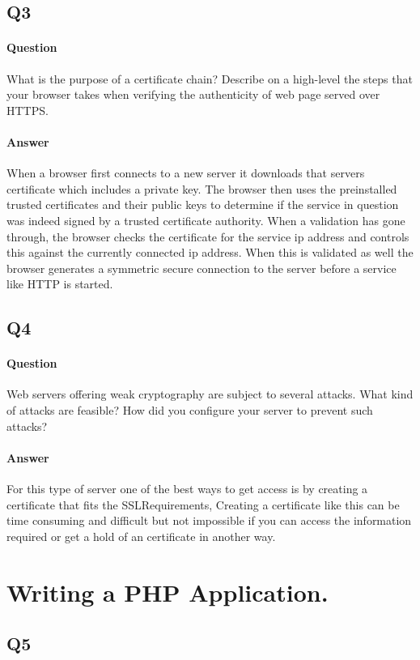 \documentclass[11pt, a4paper]{article}
\begin{document}
\subsection{Q3}
\paragraph{Question}
What is the purpose of a certificate chain? Describe on a high-level the steps that your
browser takes when verifying the authenticity of web page served over HTTPS.
\paragraph{Answer}
When a browser first connects to a new server it downloads that servers certificate which includes a private key. The browser then uses the preinstalled trusted certificates and their public keys to determine if the service in question was indeed signed by a trusted certificate authority. When a validation has gone through, the browser checks the certificate for the service ip address and controls this against the currently connected ip address. When this is validated as well the browser generates a symmetric secure connection to the server before a service like HTTP is started. 
\subsection{Q4}
\paragraph{Question}
Web servers offering weak cryptography are subject to several attacks. What kind of
attacks are feasible? How did you configure your server to prevent such attacks?
\paragraph{Answer}
For this type of server one of the best ways to get access is by creating a certificate that fits the SSLRequirements, Creating a certificate like this can be time consuming and difficult but not impossible if you can access the information required or get a hold of an certificate in another way.
\section{Writing a PHP Application.}
\subsection{Q5}
\end{document}
